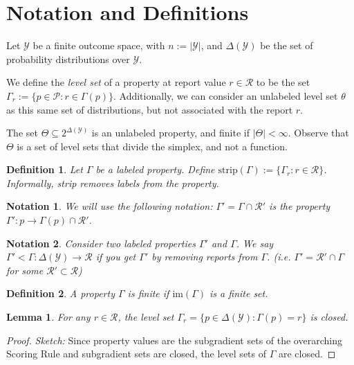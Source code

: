 \documentclass[12pt]{article}
\newcommand{\Comments}{1}
\newcommand{\mynote}[2]{\ifnum\Comments=1\textcolor{#1}{#2}\fi}
\newcommand{\jessie}[1]{\mynote{purple}{[JF: #1]}}
\renewcommand{\P}{\mathcal{P}}
\newcommand{\R}{\mathcal{R}}
\newcommand{\Y}{\mathcal{Y}}
\newcommand{\im}{\text{im}}
\newtheorem{lemma}{Lemma}
\newtheorem{definition}{Definition}
\newtheorem{notation}{Notation}
\begin{document}
\section{Notation and Definitions}

Let $\Y$ be a finite outcome space, with $n:=|\Y|$, and $\Delta(\Y)$ be the set of probability distributions over $\Y$.

We define the \emph{level set} of a property at report value $r\in\R$ to be the set $\Gamma_r := \{p\in\P : r \in \Gamma(p)\}$.
Additionally, we can consider an unlabeled level set $\theta$ as this same set of distributions, but not associated with the report $r$.

The set $\Theta \subseteq 2^{\Delta(\Y)}$ is an unlabeled property, and finite if $|\Theta| < \infty$.
Observe that $\Theta$ is a set of level sets that divide the simplex, and not a function.

\begin{definition}
Let $\Gamma$ be a labeled property.
Define $\text{strip}(\Gamma) := \{ \Gamma_r : r \in \R \}$.
Informally, strip removes labels from the property.
\end{definition}

\begin{notation}
We will use the following notation: $\Gamma' = \Gamma \cap \R'$ is the property $\Gamma' : p \to \Gamma(p) \cap \R'$.  
\end{notation}


\begin{notation}
  Consider two labeled properties $\Gamma'$ and $\Gamma$.
  We say $\Gamma' < \Gamma : \Delta(\Y) \to \R$ if you get $\Gamma'$ by removing reports from $\Gamma$.
  (i.e. $\Gamma' = \R' \cap \Gamma$ for some $\R' \subset \R$)
\end{notation}

\begin{definition}
A property $\Gamma$ is \emph{finite} if $\im(\Gamma)$ is a finite set.
\end{definition}

\begin{lemma}\label{conj:closed-level-sets}
  For any $r\in\R$, the level set $\Gamma_r = \{ p \in \Delta(\Y) : \Gamma(p) = r \}$ is closed.
\end{lemma}
\begin{proof}
  \emph{Sketch:  } Since property values are the subgradient sets of the overarching Scoring Rule and subgradient sets are closed, the level sets of $\Gamma$ are closed.
\end{proof}
\end{document}
